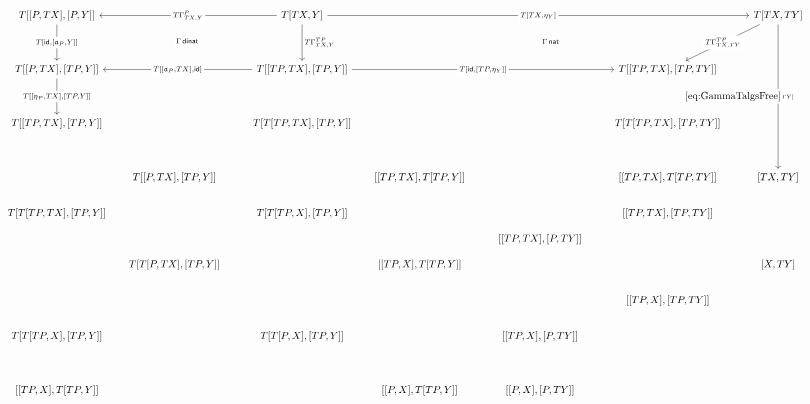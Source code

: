 \documentclass[12pt,dvipsnames,oneside]{amsart}
\theoremstyle{plain}
\theoremstyle{remark}
\theoremstyle{definition}
\newenvironment{amssidewaysfigure}{%
  \begin{landscape}
    \thispagestyle{empty}
    \begin{figure}[htbp]
}{%
    \end{figure}
  \end{landscape}
}
\newcommand{\mathscale}[2]{\scalebox{#1}{\mbox{\ensuremath{\displaystyle #2}}}}
\DeclareMathOperator{\id}{\mathsf{id}}
\newcommand{\act}{\mathfrak{a}}
\begin{document}
\begin{amssidewaysfigure}\vspace{1.3cm}
    \[\hspace{-2.8cm}\mathscale{0.725}{
        \begin{tikzcd}[ampersand replacement=\&]
        	{T[[P,TX],[P,Y]]} \&[-10pt]\& {T[TX,Y]} \&[-10pt]\&\&\& {T[TX,TY]} \\
        	\\
        	{T[[P,TX],[TP,Y]]} \&[-10pt]\& {T[[TP,TX],[TP,Y]]} \&[-10pt]\&\& {T[[TP,TX],[TP,TY]]} \\
        	\\
        	{T[[TP,TX],[TP,Y]]} \&[-10pt]\& {T[T[TP,TX],[TP,Y]]} \&[-10pt]\&\& {T[T[TP,TX],[TP,TY]]} \\
        	\\
        	\&[-10pt] {T[[P,TX],[TP,Y]]} \&\&[-10pt] {[[TP,TX],T[TP,Y]]} \&\& {[[TP,TX],T[TP,TY]]} \& {[TX,TY]} \\
        	{T[T[TP,TX],[TP,Y]]} \&[-10pt]\& {T[T[TP,X],[TP,Y]]} \&[-10pt]\&\& {[[TP,TX],[TP,TY]]} \\[-10pt]
        	\&[-10pt]\&\&[-10pt]\& {[[TP,TX],[P,TY]]} \\[-10pt]
        	\&[-10pt] {T[T[P,TX],[TP,Y]]} \&\&[-10pt] {[[TP,X],T[TP,Y]]} \&\&\& {[X,TY]} \\
        	\&[-10pt]\&\&[-10pt]\&\& {[[TP,X],[TP,TY]]} \\
        	{T[T[TP,X],[TP,Y]]} \&[-10pt]\& {T[T[P,X],[TP,Y]]} \&[-10pt]\& {[[TP,X],[P,TY]]} \\
        	\\
        	{[[TP,X],T[TP,Y]]} \&[-10pt]\&\&[-10pt] {[[P,X],T[TP,Y]]} \& {[[P,X],[P,TY]]}
        	\arrow["{{{{T[\id,[\act_P,Y]]}}}}"{description}, from=1-1, to=3-1]
        	\arrow["{{{{T\Gamma_{TX,Y}^P}}}}"{description}, from=1-3, to=1-1]
        	\arrow["{{T[TX,\eta_Y]}}"{description}, from=1-3, to=1-7]
        	\arrow["{{{\Gamma\,\mathsf{dinat}}}}"{description}, draw=none, from=1-3, to=3-1]
        	\arrow["{{{{T\Gamma_{TX,Y}^{TP}}}}}", from=1-3, to=3-3]
        	\arrow["{{{{T\Gamma_{TX,TY}^{TP}}}}}"{description}, from=1-7, to=3-6]
        	\arrow["{{\act_{[TX,TY]}}}"{description}, from=1-7, to=7-7]
        	\arrow["{{\eqref{eq:GammaTalgsFree}}}"{description, pos=0.4}, draw=none, from=1-7, to=8-6]
        	\arrow["{T[[\eta_P,TX],[TP,Y]]}"{description}, from=3-1, to=5-1]
        	\arrow["{{{\Gamma\,\mathsf{nat}}}}"{description}, draw=none, from=3-3, to=1-7]
        	\arrow["{T[[\act_P,TX],\id]}"{description}, from=3-3, to=3-1]
        	\arrow["{{T[\id,[TP,\eta_Y]]}}"{description}, from=3-3, to=3-6]

\end{tikzcd}}\]
\end{amssidewaysfigure}
\end{document}
